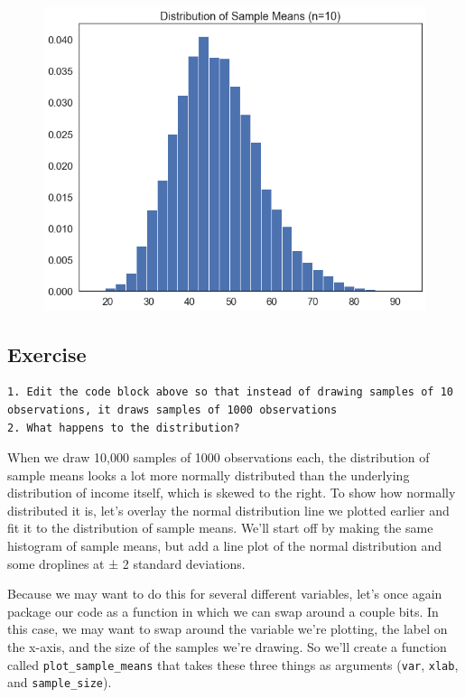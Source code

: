 \documentclass[
  letterpaper,
  DIV=11,
  numbers=noendperiod]{scrreprt}
\begin{document}
\begin{figure}[H]

{\centering \includegraphics{notebooks/W05. Distributions and Basic Statistics_files/figure-pdf/cell-24-output-1.png}

}

\end{figure}

\hypertarget{exercise-15}{%
\subsection{Exercise}\label{exercise-15}}

\begin{verbatim}
1. Edit the code block above so that instead of drawing samples of 10 observations, it draws samples of 1000 observations
2. What happens to the distribution?
\end{verbatim}

When we draw 10,000 samples of 1000 observations each, the distribution
of sample means looks a lot more normally distributed than the
underlying distribution of income itself, which is skewed to the right.
To show how normally distributed it is, let's overlay the normal
distribution line we plotted earlier and fit it to the distribution of
sample means. We'll start off by making the same histogram of sample
means, but add a line plot of the normal distribution and some droplines
at ± 2 standard deviations.

Because we may want to do this for several different variables, let's
once again package our code as a function in which we can swap around a
couple bits. In this case, we may want to swap around the variable we're
plotting, the label on the x-axis, and the size of the samples we're
drawing. So we'll create a function called \texttt{plot\_sample\_means}
that takes these three things as arguments (\texttt{var}, \texttt{xlab},
and \texttt{sample\_size}).
\end{document}
